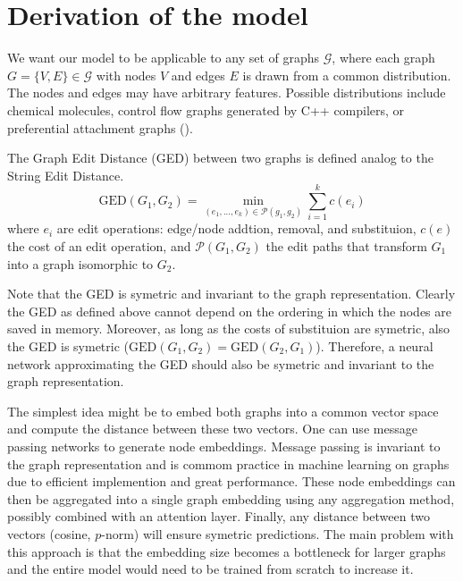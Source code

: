 \section{Derivation of the model}












We want our model to be applicable to any set of graphs $\mathcal{G}$, where each graph $G = \{V, E\} \in \mathcal{G}$ with nodes $V$ and edges $E$ is drawn from a common distribution. The nodes and edges may have arbitrary features. Possible distributions include chemical molecules, control flow graphs generated by C++ compilers, or preferential attachment graphs (\citealp{pref_att2002}).

The Graph Edit Distance (GED) between two graphs is defined analog to the String Edit Distance.
\begin{equation}
     \text{GED}(G_{1},G_{2}) = \min_{(e_{1},...,e_{k}) \in \mathcal{P}(g_{1},g_{2})} \sum_{i=1}^{k} c(e_{i})
\end{equation}
where $e_{i}$ are edit operations: edge/node addtion, removal, and substituion, $c(e)$ the cost of an edit operation, and $\mathcal{P}(G_{1},G_{2})$ the edit paths that transform $G_{1}$ into a graph isomorphic to $G_{2}$.

Note that the GED is symetric and invariant to the graph representation. Clearly the GED as defined above cannot depend on the ordering in which the nodes are saved in memory. Moreover, as long as the costs of substituion are symetric, also the GED is symetric ($\text{GED}(G_{1},G_{2}) = \text{GED}(G_{2},G_{1})$). Therefore, a neural network approximating the GED should also be symetric and invariant to the graph representation.

The simplest idea might be to embed both graphs into a common vector space and compute the distance between these two vectors. One can use message passing networks to generate node embeddings. Message passing is invariant to the graph representation and is commom practice in machine learning on graphs due to efficient implemention and great performance. These node embeddings can then be aggregated into a single graph embedding using any aggregation method, possibly combined with an attention layer. Finally, any distance between two vectors (cosine, $p$-norm) will ensure symetric predictions. The main problem with this approach is that the embedding size becomes a bottleneck for larger graphs and the entire model would need to be trained from scratch to increase it.

